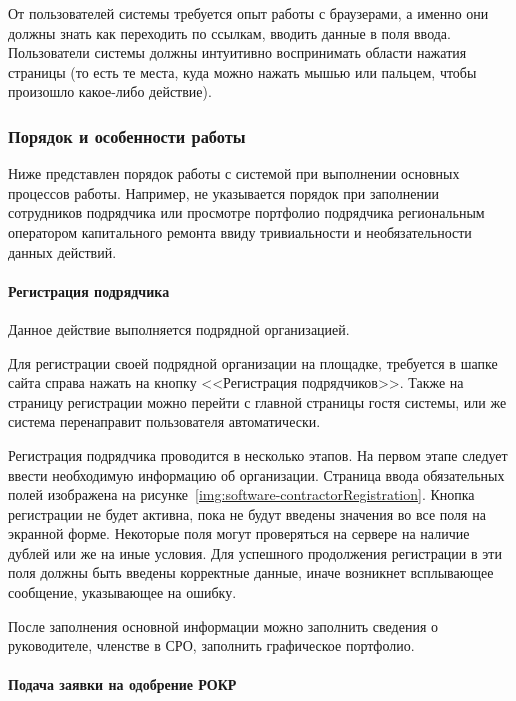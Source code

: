 От пользователей системы требуется опыт работы с браузерами, а именно они должны знать как переходить по ссылкам, вводить данные в поля ввода.
Пользователи системы должны интуитивно воспринимать области нажатия страницы (то есть те места, куда можно нажать мышью или пальцем, чтобы произошло какое-либо действие).

\subsubsection{Порядок и особенности работы}

Ниже представлен порядок работы с системой при выполнении основных процессов работы.
Например, не указывается порядок при заполнении сотрудников подрядчика или просмотре портфолио подрядчика региональным оператором капитального ремонта ввиду тривиальности и необязательности данных действий.

\paragraph{Регистрация подрядчика}

Данное действие выполняется подрядной организацией.

Для регистрации своей подрядной организации на площадке, требуется в шапке сайта справа нажать на кнопку <<Регистрация подрядчиков>>.
Также на страницу регистрации можно перейти с главной страницы гостя системы, или же система перенаправит пользователя автоматически.

Регистрация подрядчика проводится в несколько этапов.
На первом этапе следует ввести необходимую информацию об организации.
Страница ввода обязательных полей изображена на рисунке~\ref{img:software-contractorRegistration}.
Кнопка регистрации не будет активна, пока не будут введены значения во все поля на экранной форме.
Некоторые поля могут проверяться на сервере на наличие дублей или же на иные условия.
Для успешного продолжения регистрации в эти поля должны быть введены корректные данные, иначе возникнет всплывающее сообщение, указывающее на ошибку.


После заполнения основной информации можно заполнить сведения о руководителе, членстве в СРО, заполнить графическое портфолио.

\paragraph{Подача заявки на одобрение РОКР}

